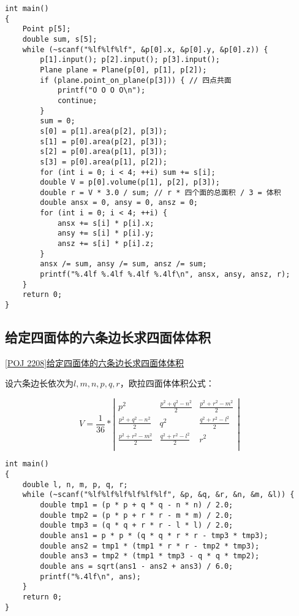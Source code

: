 \begin{lstlisting}
int main()
{
	Point p[5];
	double sum, s[5];
	while (~scanf("%lf%lf%lf", &p[0].x, &p[0].y, &p[0].z)) {
		p[1].input(); p[2].input(); p[3].input();
		Plane plane = Plane(p[0], p[1], p[2]);
		if (plane.point_on_plane(p[3])) { // 四点共面
			printf("O O O O\n");
			continue;
		}
		sum = 0;
		s[0] = p[1].area(p[2], p[3]);
		s[1] = p[0].area(p[2], p[3]);
		s[2] = p[0].area(p[1], p[3]);
		s[3] = p[0].area(p[1], p[2]);
		for (int i = 0; i < 4; ++i) sum += s[i];
		double V = p[0].volume(p[1], p[2], p[3]);
		double r = V * 3.0 / sum; // r * 四个面的总面积 / 3 = 体积
		double ansx = 0, ansy = 0, ansz = 0;
		for (int i = 0; i < 4; ++i) {
			ansx += s[i] * p[i].x;
			ansy += s[i] * p[i].y;
			ansz += s[i] * p[i].z;
		}
		ansx /= sum, ansy /= sum, ansz /= sum;
		printf("%.4lf %.4lf %.4lf %.4lf\n", ansx, ansy, ansz, r);
	}
	return 0;
}
\end{lstlisting}

\subsection{给定四面体的六条边长求四面体体积}
\underline {[POJ 2208]给定四面体的六条边长求四面体体积}

设六条边长依次为$l,m,n,p,q,r$，欧拉四面体体积公式：

\[
V=\frac{1}{36}*
\left|\begin{array}{ccc}
p^2  &\frac{p^2+q^2-n^2}{2} &\frac{p^2+r^2-m^2}{2} \\
\frac{p^2+q^2-n^2}{2} &q^2 &\frac{q^2+r^2-l^2}{2} \\
\frac{p^2+r^2-m^2}{2}  &\frac{q^2+r^2-l^2}{2}  &r^2 \\
\end{array}\right|
\]


\begin{lstlisting}
int main()
{
	double l, n, m, p, q, r;
	while (~scanf("%lf%lf%lf%lf%lf%lf", &p, &q, &r, &n, &m, &l)) {
		double tmp1 = (p * p + q * q - n * n) / 2.0;
		double tmp2 = (p * p + r * r - m * m) / 2.0;
		double tmp3 = (q * q + r * r - l * l) / 2.0;
		double ans1 = p * p * (q * q * r * r - tmp3 * tmp3);
		double ans2 = tmp1 * (tmp1 * r * r - tmp2 * tmp3);
		double ans3 = tmp2 * (tmp1 * tmp3 - q * q * tmp2);
		double ans = sqrt(ans1 - ans2 + ans3) / 6.0;
		printf("%.4lf\n", ans);
	}
	return 0;
}
\end{lstlisting}

%

